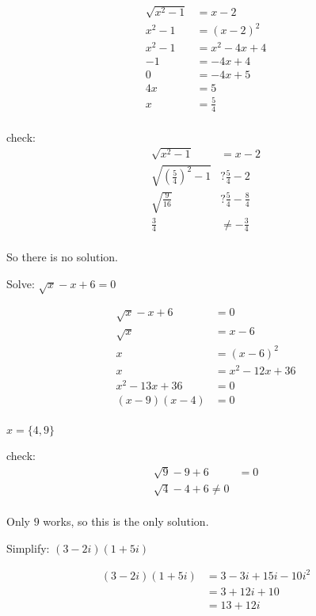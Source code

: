 \documentclass[fleqn,addpoints]{exam}
\begin{document}
\begin{questions}
\begin{solution}
\begin{align*}
  \sqrt{x^2-1} &= x - 2 \\
  x^2-1 &= (x - 2)^2 \\
  x^2-1 &= x^2 - 4x + 4 \\
  -1 &= -4x + 4 \\
  0 &= -4x + 5 \\
  4x &=  5 \\
  x &=  \frac{5}{4} \\
\end{align*}

check:
\begin{align*}
  \sqrt{x^2-1} &= x - 2 \\
  \sqrt{\left( \frac{5}{4} \right)^2-1} &? \frac{5}{4} - 2 \\
  \sqrt{\frac{9}{16}} &? \frac{5}{4} - \frac{8}{4} \\
  \frac{3}{4} &\neq -\frac{3}{4} \\
\end{align*}

So there is no solution.

\end{solution}

\question
Solve: $\sqrt{x} - x + 6 = 0$

\begin{solution}
\begin{align*}
  \sqrt{x} - x + 6 &= 0 \\
  \sqrt{x} &= x - 6 \\
  x &= (x - 6)^2 \\
  x &= x^2 - 12x + 36 \\
  x^2 - 13x + 36 &= 0 \\
  (x-9)(x-4) &= 0 \\
\end{align*}

$x = \{ 4, 9 \}$

check:
\begin{align*}
  \sqrt{9} - 9 + 6 &= 0 \\
  \sqrt{4} - 4 + 6 \neq 0 \\
\end{align*}

Only $9$ works, so this is the only solution.

\end{solution}

\question
Simplify: $(3-2i)(1+5i)$

\begin{solution}
\begin{align*}
  (3-2i)(1+5i) &= 3 - 3i + 15i - 10i^2 \\
  &= 3 + 12i + 10 \\
  &= 13 + 12i \\
\end{align*}
\end{solution}


\end{questions}
\end{document}
